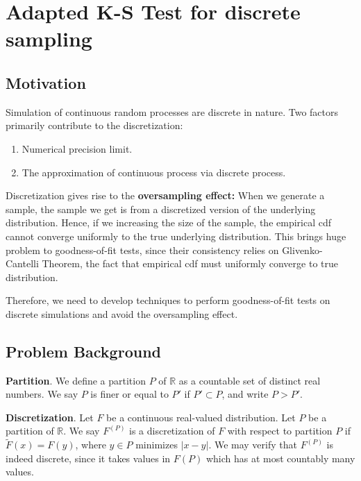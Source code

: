 
\section{Adapted K-S Test for discrete sampling}

\subsection*{Motivation}
Simulation of continuous random processes are discrete in nature. Two factors primarily contribute to the discretization:
\begin{enumerate}
	\item Numerical precision limit.
	\item The approximation of continuous process via discrete process. 
\end{enumerate}

Discretization gives rise to the \textbf{oversampling effect:} When we generate a sample, the sample we get is from a discretized version of the underlying distribution. Hence, if we increasing the size of the sample, the empirical cdf cannot converge uniformly to the true underlying distribution. This brings huge problem to goodness-of-fit tests, since their consistency relies on Glivenko-Cantelli Theorem, the fact that empirical cdf must uniformly converge to true distribution.

Therefore, we need to develop techniques to perform goodness-of-fit tests on discrete simulations and avoid the oversampling effect.

\subsection*{Problem Background}
\textbf{Partition}. We define a partition $P$ of $\mathbb{R}$ as a countable set of distinct real numbers. We say $P$ is finer or equal to $P'$ if $P' \subset P$, and write  $P > P'$.

\textbf{Discretization}. Let $F$ be a continuous real-valued distribution. Let $P$ be a partition of $\mathbb{R}$. We say $F^{(P)}$ is a discretization of $F$ with respect to partition $P$ if $\tilde F(x) = F(y)$,  
where $y \in P$ minimizes $|x - y|$. We may verify that $F^{(P)}$ is indeed discrete, since it takes values in $F(P)$ which has at most countably many values.

